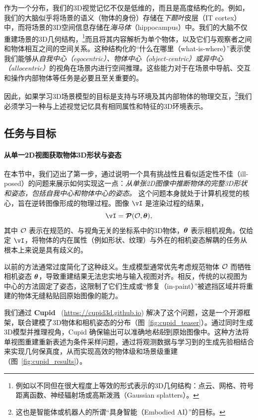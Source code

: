 \documentclass[../../book-main_zh.tex]{subfiles}
\begin{document}
作为一个分布，我们的3D视觉记忆不仅是低维的，而且是高度结构化的。例如，我们的大脑似乎将场景的语义（物体的身份）存储在{\em 下颞叶}皮层（IT cortex）中，而将场景的3D空间信息存储在{\em 海马体}（hippocampus）中。我们的大脑不仅重建场景的3D几何结构，\footnote{例如以不同但在很大程度上等效的形式表示的3D几何结构：点云、网格、符号距离函数、神经辐射场或高斯泼溅（Gaussian splatters）。}而且将其内容解析为单个物体，以及它们与观察者之间和物体相互之间的空间关系。这种结构化的“什么在哪里（what-is-where）”表示使我们能够从{\em 自我中心（egocentric）、物体中心（object-centric）或异中心（allocentric）}的视角在场景内进行空间推理。这些能力对于在场景中导航、交互和操作内部物体等任务是必要且至关重要的。

因此，如果学习3D场景模型的目标是支持与环境及其内部物体的物理交互，\footnote{这也是智能体或机器人的所谓“具身智能（Embodied AI）”的目标。}我们必须学习一种与上述视觉记忆具有相同属性和特征的3D环境表示。




\subsection{任务与目标}
\label{sub:cupid_objective}


\paragraph{从单一2D视图获取物体3D形状与姿态}
在本节中，我们迈出了第一步，通过说明一个具有挑战性且看似适定性不佳（ill-posed）的问题来展示如何实现这一点：{\em 从单张2D图像中推断物体的完整3D形状和姿态，包括自我中心和物体中心的姿态。} 这个问题本身就处于计算机视觉的核心，旨在逆转图像形成的物理过程。图像 $\image$ 是渲染过程的结果，
\[
\image = \render(\object, \pose),
\]
其中 $\mathcal{O}$ 表示在规范的、与视角无关的坐标系中的3D物体，$\boldsymbol{\theta}$ 表示相机视角。仅给定 $\image$，将物体的内在属性（例如形状、纹理）与外在的相机姿态解耦的任务从根本上来说是具有歧义的。


以前的方法通常过度简化了这种歧义。生成模型通常优先考虑规范物体 $\mathcal{O}$ 而牺牲相机姿态 $\boldsymbol{\theta}$，导致重建结果无法忠实地与输入视图对齐。相反，传统的以视图为中心的方法固定了姿态，这限制了它们生成或“修复（in-paint）”被遮挡区域并将重建的物体无缝粘贴回原始图像的能力。


我们通过 \textbf{Cupid}~\citep{huang2025cupid} (\url{https://cupid3d.github.io}) 解决了这个问题，这是一个开源框架，联合建模了3D物体和相机姿态的分布（图~\ref{fig:cupid_teaser}）。通过同时生成3D模型并推理视角，Cupid 确保输出可以准确地\textit{粘贴}到原始图像中。这种方法将单视图重建重新表述为条件采样问题，通过将观测数据与学习到的生成先验相结合来实现几何保真度，从而实现高效的物体级和场景级重建（图~\ref{fig:cupid_results}）。
\end{document}

